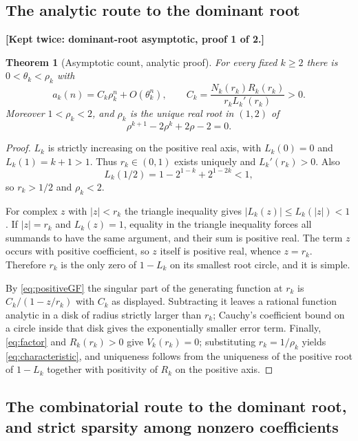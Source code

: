 \documentclass[11pt,letterpaper]{article}
\numberwithin{equation}{section}
\newtheorem{theorem}{Theorem}[section]
\theoremstyle{definition}
\theoremstyle{remark}
\begin{document}
\subsection{The analytic route to the dominant root}
\label{sec:analyticroot}

\noindent\textbf{[Kept twice: dominant-root asymptotic, proof 1 of 2.]}

\begin{theorem}[Asymptotic count, analytic proof]
\label{thm:asymptotic}
For every fixed $k\ge2$ there is $0<\theta_k<\rho_k$ with
\begin{equation}
 a_k(n)=C_k\rho_k^n+O(\theta_k^n),
 \qquad
 C_k=\frac{N_k(r_k)R_k(r_k)}{r_kL_k'(r_k)}>0 .
 \label{eq:asymptotic}
\end{equation}
Moreover $1<\rho_k<2$, and $\rho_k$ is the unique real root in $(1,2)$ of
\begin{equation}
 \rho^{k+1}-2\rho^k+2\rho-2=0 .
 \label{eq:characteristic}
\end{equation}
\end{theorem}
\begin{proof}
$L_k$ is strictly increasing on the positive real axis, with $L_k(0)=0$ and
$L_k(1)=k+1>1$. Thus $r_k\in(0,1)$ exists uniquely and $L_k'(r_k)>0$. Also
\[
 L_k(1/2)=1-2^{1-k}+2^{1-2k}<1,
\]
so $r_k>1/2$ and $\rho_k<2$.

For complex $z$ with $|z|<r_k$ the triangle inequality gives
$|L_k(z)|\le L_k(|z|)<1$. If $|z|=r_k$ and $L_k(z)=1$, equality in the
triangle inequality forces all summands to have the same argument, and
their sum is positive real. The term $z$ occurs with positive coefficient,
so $z$ itself is positive real, whence $z=r_k$. Therefore $r_k$ is the only
zero of $1-L_k$ on its smallest root circle, and it is simple.

By \eqref{eq:positiveGF} the singular part of the generating function at
$r_k$ is $C_k/(1-z/r_k)$ with $C_k$ as displayed. Subtracting it leaves a
rational function analytic in a disk of radius strictly larger than $r_k$;
Cauchy's coefficient bound on a circle inside that disk gives the
exponentially smaller error term. Finally, \eqref{eq:factor} and
$R_k(r_k)>0$ give $V_k(r_k)=0$; substituting $r_k=1/\rho_k$ yields
\eqref{eq:characteristic}, and uniqueness follows from the uniqueness of
the positive root of $1-L_k$ together with positivity of $R_k$ on the
positive axis.
\end{proof}

\subsection{The combinatorial route to the dominant root, and strict sparsity
among nonzero coefficients}
\label{sec:pfroot}
\end{document}
